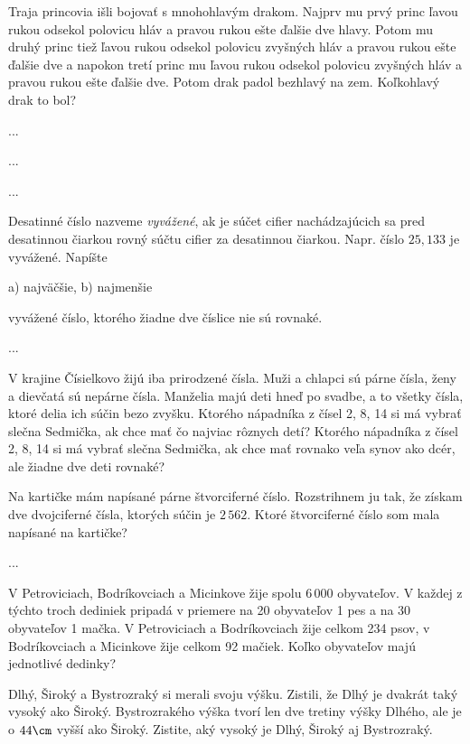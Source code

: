 {%
Traja princovia išli bojovať s mnohohlavým drakom. Najprv mu prvý princ ľavou rukou
odsekol polovicu hláv a pravou rukou ešte ďalšie dve hlavy. Potom mu druhý princ tiež ľavou
rukou odsekol polovicu zvyšných hláv a pravou rukou ešte ďalšie dve a napokon tretí princ
mu ľavou rukou odsekol polovicu zvyšných hláv a pravou rukou ešte ďalšie dve. Potom drak
padol bezhlavý na zem. Koľkohlavý drak to bol?}

{%
...}

{%
...}

{%
...}

{%
Desatinné číslo nazveme {\it vyvážené}, ak je súčet cifier nachádzajúcich sa pred desatinnou
čiarkou rovný súčtu cifier za desatinnou čiarkou. Napr. číslo $25{,}133$ je vyvážené. Napíšte
\begin{itemize}
\ite a) najväčšie,
\ite b) najmenšie
\end{itemize}
vyvážené číslo, ktorého žiadne dve číslice nie sú rovnaké.
}

{%
...}

{%
V krajine Čísielkovo žijú iba prirodzené čísla. Muži a chlapci sú párne čísla, ženy a dievčatá
sú nepárne čísla. Manželia majú deti hneď po svadbe, a to všetky čísla, ktoré delia ich súčin
bezo zvyšku. Ktorého nápadníka z čísel 2, 8, 14 si má vybrať slečna Sedmička, ak chce mať
čo najviac rôznych detí? Ktorého nápadníka z čísel 2, 8, 14 si má vybrať slečna Sedmička, ak
chce mať rovnako veľa synov ako dcér, ale žiadne dve deti rovnaké?}

{%
Na kartičke mám napísané párne štvorciferné číslo. Rozstrihnem ju tak, že získam dve
dvojciferné čísla, ktorých súčin je $2\,562$. Ktoré štvorciferné číslo som mala napísané na
kartičke?}

{%
...}

{%
V Petroviciach, Bodríkovciach a Micinkove žije spolu 6\,000 obyvateľov. V každej z týchto
troch dediniek pripadá v priemere na 20 obyvateľov 1 pes a na 30 obyvateľov 1 mačka.
V Petroviciach a Bodríkovciach žije celkom 234 psov, v Bodríkovciach a Micinkove žije
celkom 92 mačiek. Koľko obyvateľov majú jednotlivé dedinky?}

{%
Dlhý, Široký a Bystrozraký si merali svoju výšku. Zistili, že Dlhý je dvakrát taký vysoký ako
Široký. Bystrozrakého výška tvorí len dve tretiny výšky Dlhého, ale je o $44\cm$ vyšší ako
Široký. Zistite, aký vysoký je Dlhý, Široký aj Bystrozraký.}

